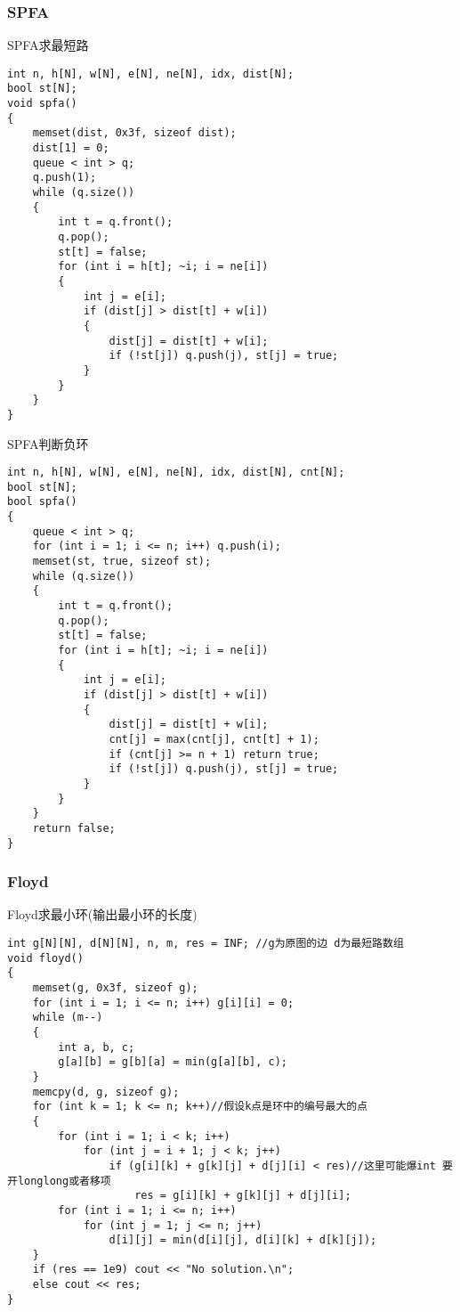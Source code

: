 \documentclass[a4paper,fontset=none]{ctexart}
\begin{document}
\subsubsection{SPFA}

SPFA求最短路

\begin{verbatim}
int n, h[N], w[N], e[N], ne[N], idx, dist[N];
bool st[N];
void spfa()
{
    memset(dist, 0x3f, sizeof dist);
    dist[1] = 0;
    queue < int > q;
    q.push(1);
    while (q.size())
    {
        int t = q.front();
        q.pop();
        st[t] = false;
        for (int i = h[t]; ~i; i = ne[i])
        {
            int j = e[i];
            if (dist[j] > dist[t] + w[i])
            {
                dist[j] = dist[t] + w[i];
                if (!st[j]) q.push(j), st[j] = true;
            }
        }
    }
}
\end{verbatim}

SPFA判断负环

\begin{verbatim}
int n, h[N], w[N], e[N], ne[N], idx, dist[N], cnt[N];
bool st[N];
bool spfa()
{
    queue < int > q;
    for (int i = 1; i <= n; i++) q.push(i);
    memset(st, true, sizeof st);
    while (q.size())
    {
        int t = q.front();
        q.pop();
        st[t] = false;
        for (int i = h[t]; ~i; i = ne[i])
        {
            int j = e[i];
            if (dist[j] > dist[t] + w[i])
            {
                dist[j] = dist[t] + w[i];
                cnt[j] = max(cnt[j], cnt[t] + 1);
                if (cnt[j] >= n + 1) return true;
                if (!st[j]) q.push(j), st[j] = true;
            }
        }
    }
    return false;
}
\end{verbatim}
\subsubsection{Floyd}

Floyd求最小环(输出最小环的长度)

\begin{verbatim}
int g[N][N], d[N][N], n, m, res = INF; //g为原图的边 d为最短路数组
void floyd()
{
    memset(g, 0x3f, sizeof g);
    for (int i = 1; i <= n; i++) g[i][i] = 0;
    while (m--)
    {
        int a, b, c;
        g[a][b] = g[b][a] = min(g[a][b], c);
    }
    memcpy(d, g, sizeof g);
    for (int k = 1; k <= n; k++)//假设k点是环中的编号最大的点
    {
        for (int i = 1; i < k; i++)
            for (int j = i + 1; j < k; j++)
                if (g[i][k] + g[k][j] + d[j][i] < res)//这里可能爆int 要开longlong或者移项
                    res = g[i][k] + g[k][j] + d[j][i];
        for (int i = 1; i <= n; i++)
            for (int j = 1; j <= n; j++)
                d[i][j] = min(d[i][j], d[i][k] + d[k][j]);
    }
    if (res == 1e9) cout << "No solution.\n";
    else cout << res;
}
\end{verbatim}
\end{document}

